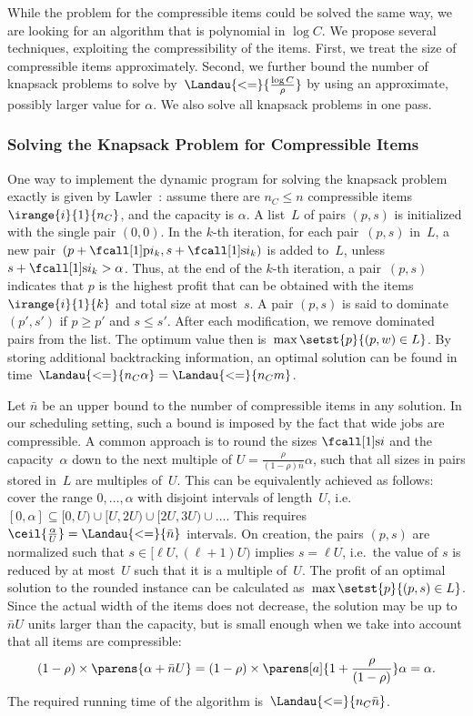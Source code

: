 While the problem for the compressible items could be solved the same way,
we are looking for an algorithm that is polynomial in $\log C$.
We propose several techniques, exploiting the compressibility of the items.
First, we treat the size of compressible items approximately.
Second, we further bound the number of knapsack problems to solve
by~$\Landau{<=}{\frac{\log C}{\rho}}$
by using an approximate, possibly larger value for $\alpha$.
We also solve all knapsack problems in one pass.


\subsubsection{Solving the Knapsack Problem for Compressible Items}
\label{sec:dp-knapsack}

One way to implement the dynamic program for solving the knapsack problem exactly is given by Lawler~\cite{lawler79}:
assume there are $n_C \leq n$ compressible items~$\irange{i}{1}{n_C}$, and the capacity is $\alpha$.
A list~$L$ of pairs $(p, s)$ is initialized with the single pair $(0, 0)$.
In the $k$-th iteration, for each pair~$(p, s)$ in~$L$,
a new pair~$(p + \pr{i_k}, s + \s{i_k})$ is added to~$L$,
unless $s + \s{i_k} > \alpha$.
Thus, at the end of the $k$-th iteration, a pair~$(p, s)$
indicates that $p$ is the highest profit that can be obtained with the items~$\irange{i}{1}{k}$
and total size at most~$s$.
A pair $(p, s)$ is said to dominate~$(p', s')$ if $p \geq p'$ and $s \leq s'$.
After each modification, we remove dominated pairs from the list.
The optimum value then is~$\max \setst{p}{(p,w) \in L}$.
By storing additional backtracking information,
an optimal solution can be found in time~$\Landau{<=}{n_C \alpha} = \Landau{<=}{n_C m}$.

Let $\bar{n}$ be an upper bound to the number of compressible items in any solution.
In our scheduling setting,
such a bound is imposed by the fact that wide jobs are compressible.
A common approach is to round the sizes $\s{i}$ and the capacity~$\alpha$
down to the next multiple of $U = \frac{\rho}{(1-\rho) \bar{n}} \alpha$,
such that all sizes in pairs stored in~$L$ are multiples of~$U$.
This can be equivalently achieved as follows:
cover the range $0, \dotsc, \alpha$ with disjoint intervals of length~$U$,
i.e.~$[0, \alpha] \subseteq [0, U) \cup [U, 2U) \cup [2U, 3U) \cup \dots$.
This requires $\ceil{\frac{\alpha}{U}} = \Landau{<=}{\bar{n}}$ intervals.
On creation, the pairs $(p, s)$ are normalized
such that $s \in [\ell U, (\ell+1)U)$ implies $s = \ell U$,
i.e.~the value of $s$ is reduced by at most~$U$ such that it is a multiple of~$U$.
The profit of an optimal solution to the rounded instance can be calculated as~$\max \setst{p}{(p, s) \in L}$.
Since the actual width of the items does not decrease,
the solution may be up to $\bar{n} U$ units larger than the capacity,
but is small enough when we take into account that all items are compressible:
\begin{equation}
  (1 - \rho) \times \parens{\alpha + \bar{n} U}
    = (1 - \rho) \times \parens[a]{1 + \frac{\rho}{(1-\rho)}} \alpha = \alpha \dpunct{.}
  \label{eq:knapsack-error}
\end{equation}
The required running time of the algorithm is~$\Landau{<=}{n_C \bar{n}}$.


